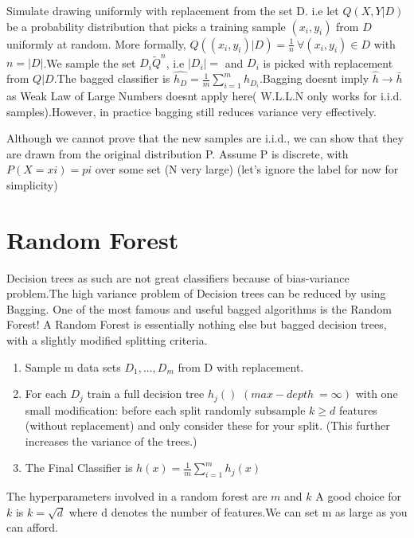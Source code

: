 \documentclass[12pt]{article}
\begin{document}
 Simulate drawing  uniformly with replacement from the set D. i.e let $Q(X,Y\vert D)$ be a probability distribution that picks a training sample $(x_{i},y_{i})$ from $D$ uniformly at random.  More formally, $Q((x_{i},y_{i}) \vert D) = \frac{1}{n}  \ \forall (x_{i},y_{i}) \in D$ with $n = \vert D \vert$.We sample the set $D_{i} \tilde Q^{n}$, i.e $\vert D_{i} \vert = $ and $D_{i}$ is picked with replacement from $Q\vert D$.The bagged classifier is $\hat{h_{D}} = \frac{1}{m} \sum_{i=1}^{m}h_{D_{i}}$.Bagging doesnt imply $\hat{h} \rightarrow \bar{h}$ as Weak Law of Large Numbers doesnt apply here( W.L.L.N only works for i.i.d. samples).However, in practice bagging still reduces variance very effectively. 
 
 
 Although we cannot prove that the new samples are i.i.d., we can show that they are drawn from the original distribution P. Assume P is discrete, with $P(X=xi)=pi$ over some set (N very large) (let's ignore the label for now for simplicity)
 
 
 
 
 \section{Random Forest}
 
 Decision trees as such are not great classifiers because of bias-variance problem.The high variance problem of Decision trees can be reduced by using Bagging. One of the most famous and useful bagged algorithms is the Random Forest! A Random Forest is essentially nothing else but bagged decision trees, with a slightly modified splitting criteria.  
 
 
 \begin{enumerate}
 	\item Sample m data sets $D_{1},...,D_{m}$ from D with replacement.
 	\item  For each $D_{j}$ train a full decision tree $h_{j}()$ $(max-depth \ = \infty)$ with one small modification: before each split randomly subsample $k \geq d$ features (without replacement) and only consider these for your split. (This further increases the variance of the trees.)
 	
 	\item The Final Classifier is $h(x) = \frac{1}{m}\sum_{i=1}^{m}h_{j}(x)$ 
 \end{enumerate}
 
 The hyperparameters involved in a random forest are $m$ and $k$ A good choice for $k$ is $k = \sqrt{d}$ where d denotes the number of features.We can set m as large as you can afford. 
 
\end{document}
